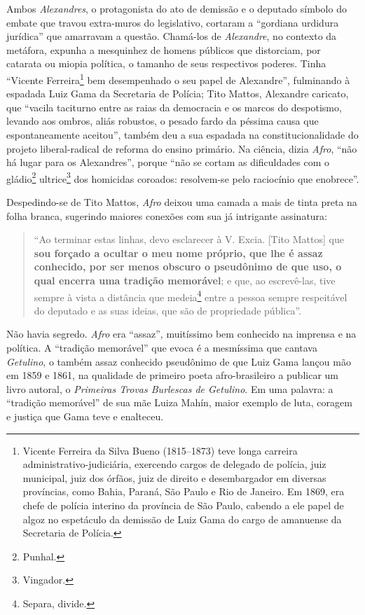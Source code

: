 Ambos \emph{Alexandres}, o protagonista do ato de demissão e o deputado
símbolo do embate que travou extra-muros do legislativo, cortaram a
``gordiana urdidura jurídica'' que amarravam a questão. Chamá-los de
\emph{Alexandre}, no contexto da metáfora, expunha a mesquinhez de
homens públicos que distorciam, por catarata ou miopia política, o
tamanho de seus respectivos poderes. Tinha ``Vicente Ferreira\footnote{Vicente Ferreira da Silva Bueno (1815--1873) teve longa carreira
  administrativo-judiciária, exercendo cargos de delegado de polícia,
  juiz municipal, juiz dos órfãos, juiz de direito e desembargador em
  diversas províncias, como Bahia, Paraná, São Paulo e Rio de Janeiro.
  Em 1869, era chefe de polícia interino da província de São Paulo,
  cabendo a ele papel de algoz no espetáculo da demissão de Luiz Gama do
  cargo de amanuense da Secretaria de Polícia.} bem desempenhado o seu
papel de Alexandre'', fulminando à espadada Luiz Gama da Secretaria de
Polícia; Tito Mattos, Alexandre caricato, que ``vacila taciturno entre as
raias da democracia e os marcos do despotismo, levando aos ombros, aliás
robustos, o pesado fardo da péssima causa que espontaneamente aceitou'',
também deu a sua espadada na constitucionalidade do projeto
liberal-radical de reforma do ensino primário. Na ciência, dizia
\emph{Afro}, ``não há lugar para os Alexandres'', porque ``não se cortam as
dificuldades com o gládio\footnote{Punhal.} ultrice\footnote{Vingador.} dos homicidas coroados: resolvem-se pelo raciocínio que
enobrece''.

Despedindo-se de Tito Mattos, \emph{Afro} deixou uma camada a mais de
tinta preta na folha branca, sugerindo maiores conexões com sua já
intrigante assinatura:

\begin{quote}
``Ao terminar estas linhas, devo esclarecer à V. Excia. {[}Tito Mattos{]}
que \textbf{sou forçado a ocultar o meu nome próprio, que lhe é assaz
conhecido, por ser menos obscuro o pseudônimo de que uso, o qual encerra
uma tradição memorável}; e que, ao escrevê-las, tive sempre à vista a
distância que medeia\footnote{Separa, divide.} entre a pessoa sempre
respeitável do deputado e as suas ideias, que são de propriedade
pública''.
\end{quote}

Não havia segredo. \emph{Afro} era ``assaz'', muitíssimo bem conhecido na
imprensa e na política. A ``tradição memorável'' que evoca é a mesmíssima
que cantava \emph{Getulino}, o também assaz conhecido pseudônimo de que
Luiz Gama lançou mão em 1859 e 1861, na qualidade de primeiro poeta
afro-brasileiro a publicar um livro autoral, o \emph{Primeiras Trovas
Burlescas de Getulino}. Em uma palavra: a ``tradição memorável'' de sua
mãe Luiza Mahín, maior exemplo de luta, coragem e justiça que Gama teve
e enalteceu.

